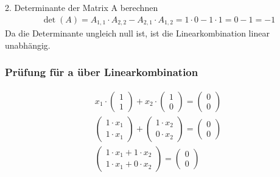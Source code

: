 2. Determinante der Matrix A berechnen
\begin{align*}
    \det(A) = A_{1,1} \cdot A_{2,2} - A_{2,1} \cdot A_{1,2} = 1 \cdot 0 - 1 \cdot 1 = 0 - 1 = -1
\end{align*}
Da die Determinante ungleich null ist, ist die Linearkombination linear unabhängig.

\subsubsection{Prüfung für a über Linearkombination}

\begin{align*}
    x_1 \cdot \begin{pmatrix}
                  1 \\1
              \end{pmatrix} + x_2 \cdot \begin{pmatrix}
                                            1 \\0
                                        \end{pmatrix} = \begin{pmatrix}
                                                            0 \\0
                                                        \end{pmatrix}            \\
    \begin{pmatrix}
        1 \cdot x_1 \\1 \cdot x_1
    \end{pmatrix} +\begin{pmatrix}
                       1 \cdot x_2 \\0 \cdot x_2
                   \end{pmatrix} = \begin{pmatrix}
                                       0 \\0
                                   \end{pmatrix}                                 \\
    \begin{pmatrix}
        1 \cdot x_1 + 1 \cdot x_2 \\1 \cdot x_1 + 0 \cdot x_2
    \end{pmatrix} = \begin{pmatrix}
                        0 \\0
                    \end{pmatrix}                          \\

\end{align*}
